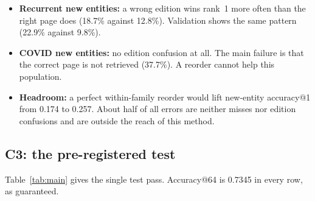 \documentclass[conference]{IEEEtran}
\begin{document}
\begin{itemize}
\item \textbf{Recurrent new entities:} a wrong edition wins rank~1 more often than the right page
does (18.7\% against 12.8\%). Validation shows the same pattern (22.9\% against 9.8\%).
\item \textbf{COVID new entities:} no edition confusion at all. The main failure is that the correct
page is not retrieved (37.7\%). A reorder cannot help this population.
\item \textbf{Headroom:} a perfect within-family reorder would lift new-entity accuracy@1 from 0.174
to 0.257. About half of all errors are neither misses nor edition confusions and are outside the reach
of this method.
\end{itemize}

\subsection{C3: the pre-registered test}

Table~\ref{tab:main} gives the single test pass. Accuracy@64 is 0.7345 in every row, as guaranteed.
\end{document}
